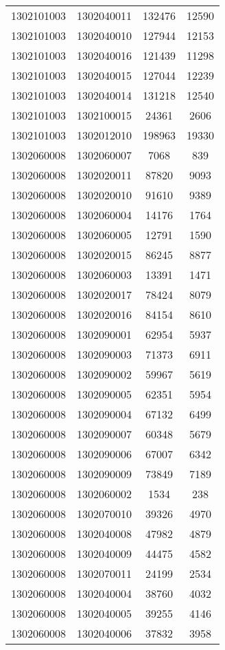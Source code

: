 \begin{longtable}{llcc}
1302101003 & 1302040011 & 132476 & 12590\\
1302101003 & 1302040010 & 127944 & 12153\\
1302101003 & 1302040016 & 121439 & 11298\\
1302101003 & 1302040015 & 127044 & 12239\\
1302101003 & 1302040014 & 131218 & 12540\\
1302101003 & 1302100015 & 24361 & 2606\\
1302101003 & 1302012010 & 198963 & 19330\\
1302060008 & 1302060007 & 7068 & 839\\
1302060008 & 1302020011 & 87820 & 9093\\
1302060008 & 1302020010 & 91610 & 9389\\
1302060008 & 1302060004 & 14176 & 1764\\
1302060008 & 1302060005 & 12791 & 1590\\
1302060008 & 1302020015 & 86245 & 8877\\
1302060008 & 1302060003 & 13391 & 1471\\
1302060008 & 1302020017 & 78424 & 8079\\
1302060008 & 1302020016 & 84154 & 8610\\
1302060008 & 1302090001 & 62954 & 5937\\
1302060008 & 1302090003 & 71373 & 6911\\
1302060008 & 1302090002 & 59967 & 5619\\
1302060008 & 1302090005 & 62351 & 5954\\
1302060008 & 1302090004 & 67132 & 6499\\
1302060008 & 1302090007 & 60348 & 5679\\
1302060008 & 1302090006 & 67007 & 6342\\
1302060008 & 1302090009 & 73849 & 7189\\
1302060008 & 1302060002 & 1534 & 238\\
1302060008 & 1302070010 & 39326 & 4970\\
1302060008 & 1302040008 & 47982 & 4879\\
1302060008 & 1302040009 & 44475 & 4582\\
1302060008 & 1302070011 & 24199 & 2534\\
1302060008 & 1302040004 & 38760 & 4032\\
1302060008 & 1302040005 & 39255 & 4146\\
1302060008 & 1302040006 & 37832 & 3958\\

\end{longtable}
